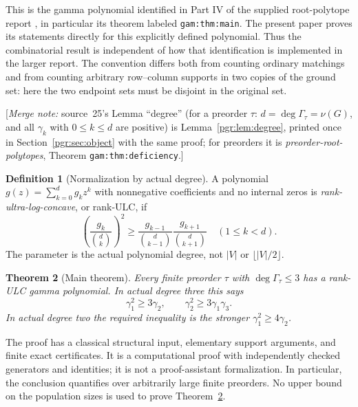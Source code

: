 \documentclass[11pt]{article}
\numberwithin{equation}{section}
\newtheorem{theorem}{Theorem}[section]\newtheorem{lemma}[theorem]{Lemma}\newtheorem{proposition}[theorem]{Proposition}\newtheorem{corollary}[theorem]{Corollary}
\theoremstyle{definition}\newtheorem{definition}[theorem]{Definition}\newtheorem{remark}[theorem]{Remark}
\newcommand{\Ga}{\Gamma}                   %
\newcommand{\mnote}[1]{[\textit{Merge note:} #1]}
\newcommand{\prp}{\emph{preorder-root-polytopes}}
\begin{document}
This is the gamma polynomial identified in Part IV of the supplied root-polytope report \cite{PRP}, in particular its theorem labeled \texttt{gam:thm:main}. The present paper proves its statements directly for this explicitly defined polynomial. Thus the combinatorial result is independent of how that identification is implemented in the larger report. The convention differs both from counting ordinary matchings and from counting arbitrary row--column supports in two copies of the ground set: here the two endpoint sets must be disjoint in the original set.


\mnote{source~25's Lemma ``degree'' (for a preorder $\tau$:
$d=\deg\Ga_\tau=\nu(G)$, and all $\gamma_k$ with $0\le k\le d$ are
positive) is Lemma~\ref{pgr:lem:degree}, printed once in
Section~\ref{pgr:sec:object} with the same proof; for preorders it is
\prp, Theorem \texttt{gam:thm:deficiency}.}


\begin{definition}[Normalization by actual degree]
A polynomial $g(z)=\sum_{k=0}^d g_kz^k$ with nonnegative coefficients and no internal zeros is \emph{rank-ultra-log-concave}, or rank-ULC, if
\begin{equation}\label{pgr:u:d3:eq:ulc}
 \left(\frac{g_k}{\binom dk}\right)^2\ge
 \frac{g_{k-1}}{\binom d{k-1}}\frac{g_{k+1}}{\binom d{k+1}}
 \quad(1\le k<d).
\end{equation}
The parameter is the actual polynomial degree, not $|V|$ or $\lfloor|V|/2\rfloor$.
\end{definition}

\begin{theorem}[Main theorem]\label{pgr:u:d3:thm:main}
Every finite preorder $\tau$ with $\deg\Ga_\tau\le3$ has a rank-ULC gamma polynomial. In actual degree three this says
\begin{equation}\label{pgr:u:d3:eq:cubicgaps}
 \gamma_1^2\ge3\gamma_2,\qquad
 \gamma_2^2\ge3\gamma_1\gamma_3.
\end{equation}
In actual degree two the required inequality is the stronger
$\gamma_1^2\ge4\gamma_2$.
\end{theorem}

The proof has a classical structural input, elementary support arguments, and finite exact certificates. It is a computational proof with independently checked generators and identities; it is not a proof-assistant formalization. In particular, the conclusion quantifies over arbitrarily large finite preorders. No upper bound on the population sizes is used to prove Theorem~\ref{pgr:u:d3:thm:main}.
\end{document}
